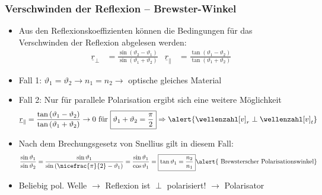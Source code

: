 \begin{frame}
  \frametitle{Verschwinden der Reflexion -- Brewster-Winkel}  
  \begin{itemize}[<+->]
  \item Aus den Reflexionskoeffizienten können die Bedingungen für das \alert{Verschwinden der Reflexion} abgelesen werden:
\begin{align*}
  \underline{r}_\perp &= \frac{\sin\left(\vartheta_2-\vartheta_1\right)}{\sin\left(\vartheta_1+\vartheta_2\right)} & \underline{r}_\parallel &= \frac{\tan\left(\vartheta_1-\vartheta_2\right)}{\tan\left(\vartheta_1+\vartheta_2\right)}
\end{align*}
\item Fall 1: \(\vartheta_1=\vartheta_2 \to n_1=n_2 \to\) \alert{optische gleiches Material}
\item Fall 2: Nur für \alert{parallele Polarisation} ergibt sich eine weitere Möglichkeit
   \begin{equation*}
     \underline{r}_\parallel = \frac{\tan\left(\vartheta_1-\vartheta_2\right)}{\tan\left(\vartheta_1+\vartheta_2\right)} \to 0 \text{ für } \boxed{\vartheta_1+\vartheta_2 = \frac{\pi}{2}} \Rightarrow \alert{\wellenzahl[v]_r \perp \wellenzahl[v]_t}
   \end{equation*}
\item Nach dem Brechungsgesetz von Snellius gilt in diesem Fall:
  \begin{equation*}
    \frac{\sin\vartheta_1}{\sin\vartheta_2} = \frac{\sin\vartheta_1}{\sin\left(\nicefrac{\pi}{2}-\vartheta_1\right)} = \frac{\sin\vartheta_1}{\cos\vartheta_1} = \boxed{\tan\vartheta_1=\frac{n_2}{n_1} } \alert{\text{ Brewsterscher Polarisationswinkel}}
  \end{equation*}
  \item Beliebig pol. Welle \(\to\) Reflexion ist \(\perp\) polarisiert! \(\to\) \alert{Polarisator}
\end{itemize}
\end{frame}

